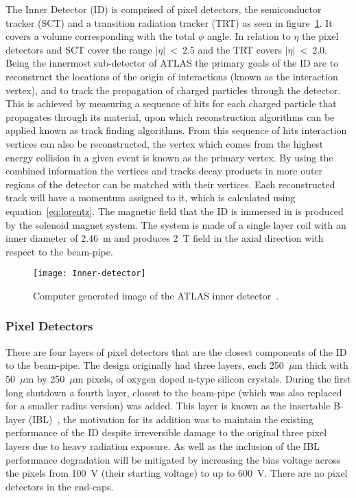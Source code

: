 The Inner Detector (ID) is comprised of pixel detectors, the semiconductor
tracker (SCT) and a transition radiation tracker (TRT) as seen in
figure~\ref{fig:ATLAS-inner-det}. It covers a volume corresponding with the
total $\phi$ angle. In relation to $\eta$ the pixel detectors and SCT cover the
range $|\eta|~<~2.5$ and the TRT covers $|\eta|~<~2.0$. Being the innermost
sub-detector of ATLAS the primary goals of the ID are to reconstruct the
locations of the origin of interactions (known as the interaction vertex), and
to track the propagation of charged particles through the detector. This is
achieved by measuring a sequence of hits for each charged particle that
propagates through its material, upon which reconstruction algorithms can be
applied known as track finding algorithms. From this sequence of hits
interaction vertices can also be reconstructed, the vertex which comes from the
highest energy collision in a given event is known as the primary vertex. By
using the combined information the vertices and tracks decay products in more
outer regions of the detector can be matched with their vertices. Each
reconstructed track will have a momentum assigned to it, which is calculated
using equation~\ref{eq:lorentz}. The magnetic field that the ID is immersed in
is produced by the solenoid magnet system. The system is made of a single layer
coil with an inner diameter of 2.46~m  and produces 2~T field in the axial
direction with respect to the beam-pipe.
\begin{figure}[h]
  \centering
  \texttt{[image: Inner-detector]}
  \caption[ATLAS inner detector]{Computer generated image of the ATLAS inner
    detector~\cite{ATLAS-inner-det}.}%
  \label{fig:ATLAS-inner-det}
\end{figure}

\subsubsection{Pixel Detectors}

There are four layers of pixel detectors that are the closest components of the
ID to the beam-pipe. The design originally had three layers, each 250~$\mu$m
thick with 50~$\mu$m by 250~$\mu$m pixels, of oxygen doped n-type silicon
crystals. During the first long shutdown a fourth layer, closest to the
beam-pipe (which was also replaced for a smaller radius version) was added. This
layer is known as the insertable B-layer (IBL)~\cite{IBL-TDR}, the motivation
for its addition was to maintain the existing performance of the ID despite
irreversible damage to the original three pixel layers due to heavy radiation
exposure. As well as the inclusion of the IBL performance degradation will be
mitigated by increasing the bias voltage across the pixels from 100~V (their
starting voltage) to up to 600~V. There are no pixel detectors in the end-caps.

